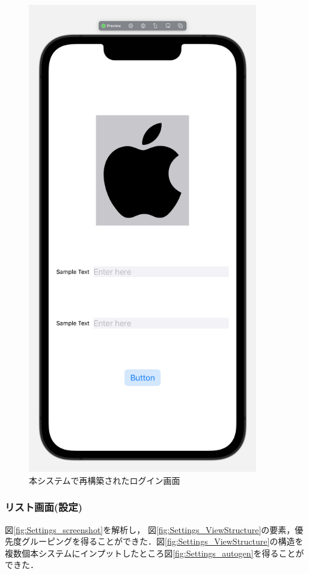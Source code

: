 \begin{figure}[htbp]
  \begin{minipage}{\hsize}
    \begin{center}
       \includegraphics[width=100mm]{img/wave_autogen.png}
    \end{center}
    \caption{本システムで再構築されたログイン画面}
    \label{fig:wave_autogen}
  \end{minipage}
\end{figure}

\subsubsection{リスト画面(設定)}
図\ref{fig:Settings_screenshot}を解析し， 図\ref{fig:Settings_ViewStructure}の要素，優先度グルーピングを得ることができた．図\ref{fig:Settings_ViewStructure}の構造を複数個本システムにインプットしたところ図\ref{fig:Settings_autogen}を得ることができた．

